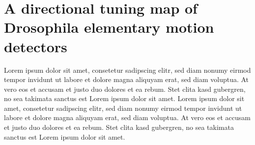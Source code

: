 \section{A directional tuning map of Drosophila elementary motion detectors}
\label{sct:manuscript_maisak}

Lorem ipsum dolor sit amet, consetetur sadipscing elitr, sed diam nonumy eirmod tempor invidunt ut labore et dolore magna aliquyam erat, sed diam voluptua. At vero eos et accusam et justo duo dolores et ea rebum. Stet clita kasd gubergren, no sea takimata sanctus est Lorem ipsum dolor sit amet. Lorem ipsum dolor sit amet, consetetur sadipscing elitr, sed diam nonumy eirmod tempor invidunt ut labore et dolore magna aliquyam erat, sed diam voluptua. At vero eos et accusam et justo duo dolores et ea rebum. Stet clita kasd gubergren, no sea takimata sanctus est Lorem ipsum dolor sit amet.

\cleardoublepage


